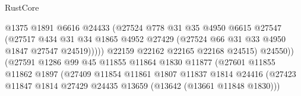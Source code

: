 \begin{lexlean}{RustCore}
\begin{coremodule}
                                              @1375
                                              @1891
                                              @6616
                                              @24433
                                              (@27524
                                                @778
                                                @31
                                                @35
                                                @4950
                                                @6615
                                                @27547
                                                (@27517
                                                  @434
                                                  @31
                                                  @34
                                                  @1865
                                                  @4952
                                                  @27429
                                                  (@27524 @66 @31 @33 @4950 @1847 @27547 @24519)))))
                                          @22159
                                          @22162
                                          @22165
                                          @22168
                                          @24515)
                                        @24550))
                                    (@27591
                                      @1286
                                      @99
                                      @45
                                      @11855
                                      @11864
                                      @1830
                                      @11877
                                      (@27601
                                        @11855
                                        @11862
                                        @1897
                                        (@27409
                                          @11854
                                          @11861
                                          @1807
                                          @11837
                                          @1814
                                          @24416
                                          (@27423
                                            @11847
                                            @1814
                                            @27429
                                            @24435
                                            @13659
                                            (@13642 (@13661 @11848 @1830)))

\end{coremodule}
\end{lexlean}
